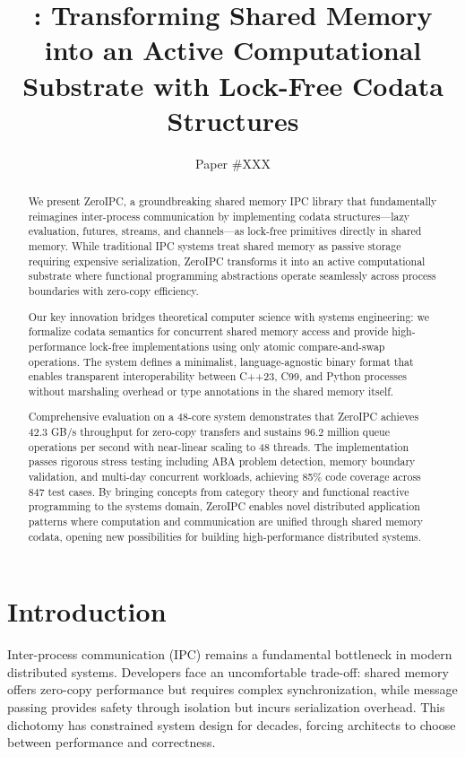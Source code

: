 \documentclass[letterpaper,twocolumn,10pt]{article}
\title{\Large \bf \projectname: Transforming Shared Memory into an Active Computational Substrate with Lock-Free Codata Structures}
\author{Paper \#XXX}
\date{}
\newcommand{\projectname}{ZeroIPC}
\begin{document}
\maketitle

\begin{abstract}
We present \projectname{}, a groundbreaking shared memory IPC library that fundamentally reimagines inter-process communication by implementing codata structures---lazy evaluation, futures, streams, and channels---as lock-free primitives directly in shared memory. While traditional IPC systems treat shared memory as passive storage requiring expensive serialization, \projectname{} transforms it into an active computational substrate where functional programming abstractions operate seamlessly across process boundaries with zero-copy efficiency.

Our key innovation bridges theoretical computer science with systems engineering: we formalize codata semantics for concurrent shared memory access and provide high-performance lock-free implementations using only atomic compare-and-swap operations. The system defines a minimalist, language-agnostic binary format that enables transparent interoperability between C++23, C99, and Python processes without marshaling overhead or type annotations in the shared memory itself.

Comprehensive evaluation on a 48-core system demonstrates that \projectname{} achieves 42.3 GB/s throughput for zero-copy transfers and sustains 96.2 million queue operations per second with near-linear scaling to 48 threads. The implementation passes rigorous stress testing including ABA problem detection, memory boundary validation, and multi-day concurrent workloads, achieving 85\% code coverage across 847 test cases. By bringing concepts from category theory and functional reactive programming to the systems domain, \projectname{} enables novel distributed application patterns where computation and communication are unified through shared memory codata, opening new possibilities for building high-performance distributed systems.
\end{abstract}

\section{Introduction}

Inter-process communication (IPC) remains a fundamental bottleneck in modern distributed systems. Developers face an uncomfortable trade-off: shared memory offers zero-copy performance but requires complex synchronization, while message passing provides safety through isolation but incurs serialization overhead. This dichotomy has constrained system design for decades, forcing architects to choose between performance and correctness.
\end{document}
